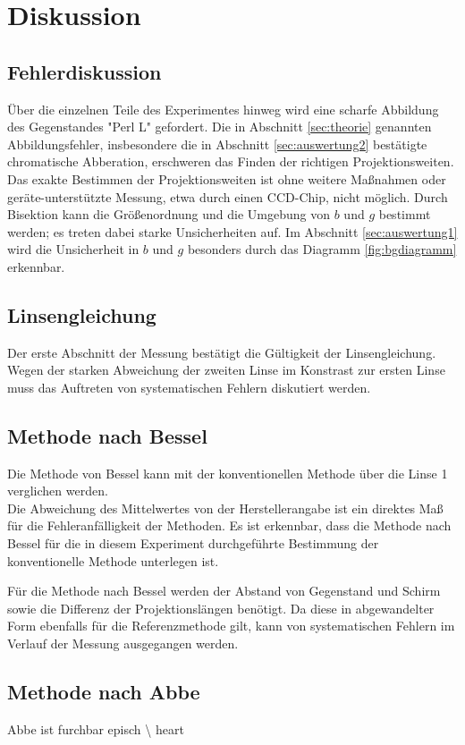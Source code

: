 \section{Diskussion}
\label{sec:Diskussion}
\subsection{Fehlerdiskussion}
Über die einzelnen Teile des Experimentes hinweg wird eine scharfe Abbildung des Gegenstandes "Perl L" gefordert.
Die in Abschnitt \ref{sec:theorie} genannten Abbildungsfehler, 
insbesondere die in Abschnitt \ref{sec:auswertung2} bestätigte chromatische Abberation, 
erschweren das Finden der richtigen Projektionsweiten. 
Das exakte Bestimmen der Projektionsweiten ist ohne weitere Maßnahmen oder geräte-unterstützte Messung, etwa durch einen CCD-Chip, nicht möglich.
Durch Bisektion kann die Größenordnung und die Umgebung von $b$ und $g$ bestimmt werden; es treten dabei starke Unsicherheiten auf.
Im Abschnitt \ref{sec:auswertung1} wird die Unsicherheit in $b$ und $g$ besonders durch das Diagramm \ref{fig:bgdiagramm} erkennbar.

\subsection{Linsengleichung}
Der erste Abschnitt der Messung bestätigt die Gültigkeit der Linsengleichung.\\
Wegen der starken Abweichung der zweiten Linse im Konstrast zur ersten Linse muss das Auftreten von systematischen Fehlern diskutiert werden.

\subsection{Methode nach Bessel}
Die Methode von Bessel kann mit der konventionellen Methode über die Linse 1 verglichen werden.\\
Die Abweichung des Mittelwertes von der Herstellerangabe ist ein direktes Maß für die Fehleranfälligkeit der Methoden. 
Es ist erkennbar, dass die Methode nach Bessel für die in diesem Experiment durchgeführte Bestimmung der konventionelle Methode unterlegen ist.

Für die Methode nach Bessel werden der Abstand von Gegenstand und Schirm sowie die Differenz der Projektionslängen benötigt. 
Da diese in abgewandelter Form ebenfalls für die Referenzmethode gilt, kann von systematischen Fehlern im Verlauf der Messung ausgegangen werden.

\subsection{Methode nach Abbe}
Abbe ist furchbar episch \backslash\! heart